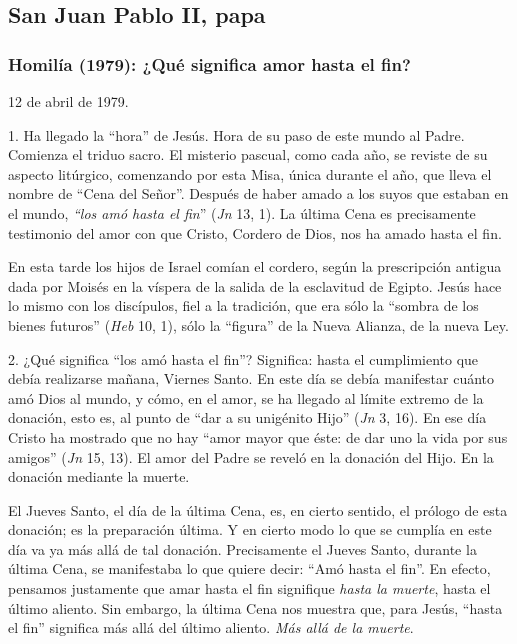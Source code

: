 			\subsection{San Juan Pablo II, papa}
			
			\subsubsection{Homilía (1979): ¿Qué significa amor hasta el fin?}
			
			\begin{referencia}12 de abril de 1979.\end{referencia}
			
			\begin{body}1. Ha llegado la “hora” de Jesús. Hora de su paso de este mundo al Padre. Comienza el triduo sacro. El misterio pascual, como cada año, se reviste de su aspecto litúrgico, comenzando por esta Misa, única durante el año, que lleva el nombre de “Cena del Señor”. Después de haber amado a los suyos que estaban en el mundo, \textit{“los amó hasta el fin}” (\textit{Jn} 13, 1). La última Cena es precisamente testimonio del amor con que Cristo, Cordero de Dios, nos ha amado hasta el fin.\end{body}
			
			\begin{body}En esta tarde los hijos de Israel comían el cordero, según la prescripción antigua dada por Moisés en la víspera de la salida de la esclavitud de Egipto. Jesús hace lo mismo con los discípulos, fiel a la tradición, que era sólo la “sombra de los bienes futuros” (\textit{Heb} 10, 1), sólo la “figura” de la Nueva Alianza, de la nueva Ley.\end{body}
			
			\begin{body}2. ¿Qué significa “los amó hasta el fin”? Significa: hasta el cumplimiento que debía realizarse mañana, Viernes Santo. En este día se debía manifestar cuánto amó Dios al mundo, y cómo, en el amor, se ha llegado al límite extremo de la donación, esto es, al punto de “dar a su unigénito Hijo” (\textit{Jn} 3, 16). En ese día Cristo ha mostrado que no hay “amor mayor que éste: de dar uno la vida por sus amigos” (\textit{Jn} 15, 13). El amor del Padre se reveló en la donación del Hijo. En la donación mediante la muerte.\end{body}
			
			\begin{body}El Jueves Santo, el día de la última Cena, es, en cierto sentido, el prólogo de esta donación; es la preparación última. Y en cierto modo lo que se cumplía en este día va ya más allá de tal donación. Precisamente el Jueves Santo, durante la última Cena, se manifestaba lo que quiere decir: “Amó hasta el fin”. En efecto, pensamos justamente que amar hasta el fin signifique \textit{hasta la muerte}, hasta el último aliento. Sin embargo, la última Cena nos muestra que, para Jesús, “hasta el fin” significa más allá del último aliento. \textit{Más allá de la muerte}.\end{body}
			
